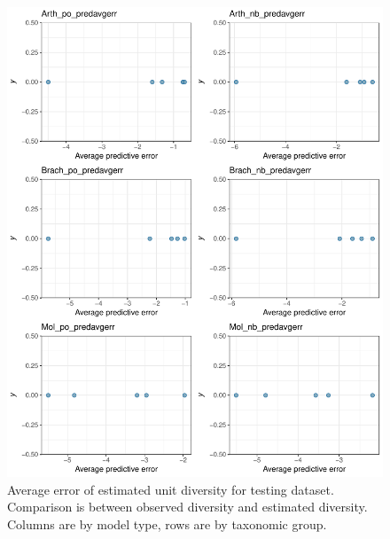 \documentclass[12pt,letterpaper]{article}
\begin{document}
\afterpage{\clearpage}
\begin{figure}[h]
  \centering
  \includegraphics[width=\textwidth,height=0.8\textheight,keepaspectratio=true]{figure/pred_avgerr}
  \caption{Average error of estimated unit diversity for testing dataset. Comparison is between observed diversity and estimated diversity. Columns are by model type, rows are by taxonomic group.}
  \label{fig:pred_avgerr}
\end{figure}
\end{document}
